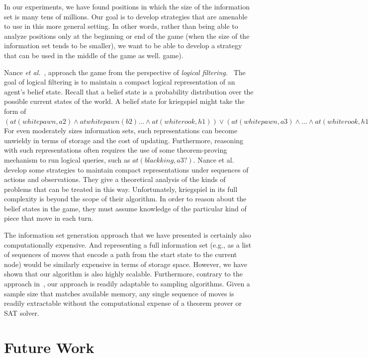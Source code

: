 \documentclass[11pt]{article}
\newcommand{\etal}{{\em et al.}\ }
\begin{document}
In our experiments, we have found positions in which the size of the information set is many tens of millions.  Our goal
is to develop strategies that are amenable to use in this more general setting.   In other words, rather than being able
to analyze positions only at the beginning or end of the game (when the size of the information set tends to be
smaller), we want to be able to develop a strategy that can be used in the middle of the game as well.  game). 

Nance \etal, approach the game from the perspective of {\em logical filtering.}~\cite{nance06reasoning}  The goal of
logical filtering is to maintain a compact logical representation of an agent's belief state.  Recall that a belief
state is a probability distribution over the possible current states of the world.  A belief state for kriegspiel might
take the form of $(at(whitepawn,a2) \wedge at whitepawn(b2) \ldots \wedge at(whiterook,h1)) \vee (at(whitepawn,a3)
\wedge \ldots \wedge at(whiterook,h1)) \ldots$  For even moderately sizes information sets, such
representations can become unwieldy in terms of storage and the cost of updating.  Furthermore, reasoning with such
representations often requires the use of some theorem-proving mechanism to run logical queries, such
as $at(blackking,a3?)$. Nance et al. develop some strategies to maintain compact representations under
sequences of actions and observations.  They give a theoretical analysis of the kinds of problems that can be treated in
this way.  Unfortunately, kriegspiel in its full complexity is beyond the scope of their algorithm.  In order to reason
about the belief states in the game, they must assume knowledge of the particular kind of piece that move in each turn.

The information set generation approach that we have presented is certainly also computationally expensive.  And
representing a full information set (e.g., as a list of sequences of moves that encode a path from the start state to
the current node) would be similarly expensive in terms of storage space.  However, we have shown that our algorithm is
also highly scalable.  Furthermore, contrary to the approach in~\cite{nance06reasoning}, our approach is readily
adaptable to sampling algorithms.  Given a sample size that matches available memory, any single sequence of moves is
readily extractable without the computational expense of a theorem prover or SAT solver.

\section{Future Work}
\end{document}
